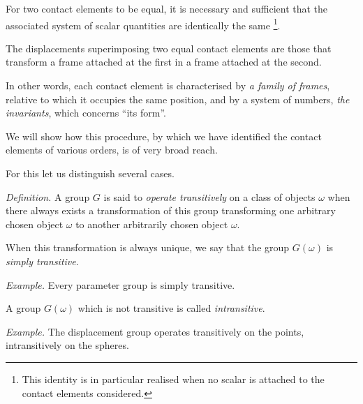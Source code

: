 \documentclass[leqno,11pt]{book}
\numberwithin{equation}{chapter}
\theoremstyle{shape1}
\theoremstyle{shapesmall}
\newcommand{\somespace}{\vspace{9pt}}
\begin{document}
\somespace

For two contact elements to be equal, it is necessary and sufficient that the associated system of scalar quantities are identically the same \footnote{This identity is in particular realised when no scalar is attached to the contact elements considered.}.

The displacements superimposing two equal contact elements are those that transform a frame attached at the first in a frame attached at the second.

In other words, each contact element is characterised by \emph{a family of frames}, relative to which it occupies the same position, and by a system of numbers, \emph{the invariants}, which concerns ``its form''.

\somespace

We will show how this procedure, by which we have identified the contact elements of various orders, is of very broad reach.

For this let us distinguish several cases.

\somespace

\emph{Definition.} A group $G$ is said to \emph{operate transitively} on a class of objects $\omega$ when there always exists a transformation of this group transforming one arbitrary chosen object $\omega$ to another arbitrarily chosen object $\omega$.

When this transformation is always unique, we say that the group $G(\omega)$ is \emph{simply transitive}.

\somespace

{\small
\emph{Example.} Every parameter group is simply transitive.
}

\somespace

A group $G(\omega)$ which is not transitive is called \emph{intransitive}.

\somespace
{\small
\emph{Example.} The displacement group operates transitively on the points, intransitively on the spheres.
}
\end{document}
